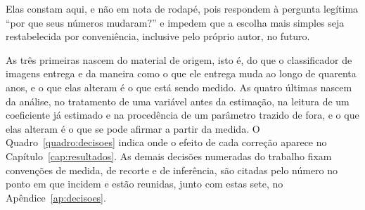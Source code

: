 Elas constam aqui, e não em nota de rodapé, pois respondem à pergunta legítima ``por que
seus números mudaram?'' e impedem que a escolha mais simples seja
restabelecida por conveniência, inclusive pelo próprio autor, no futuro.

As três primeiras nascem do material de origem, isto é, do que o classificador
de imagens entrega e da maneira como o que ele entrega muda ao longo de
quarenta anos, e o que elas alteram é o que está sendo medido. As quatro
últimas nascem da análise, no tratamento de uma variável antes da estimação,
na leitura de um coeficiente já estimado e na procedência de um parâmetro
trazido de fora, e o que elas alteram é o que se pode afirmar a partir da
medida. O Quadro~\ref{quadro:decisoes} indica onde o efeito de cada correção
aparece no Capítulo~\ref{cap:resultados}. As demais decisões numeradas do
trabalho fixam convenções de medida, de recorte e de inferência, são citadas
pelo número no ponto em que incidem e estão reunidas, junto com estas sete, no
Apêndice~\ref{ap:decisoes}.

